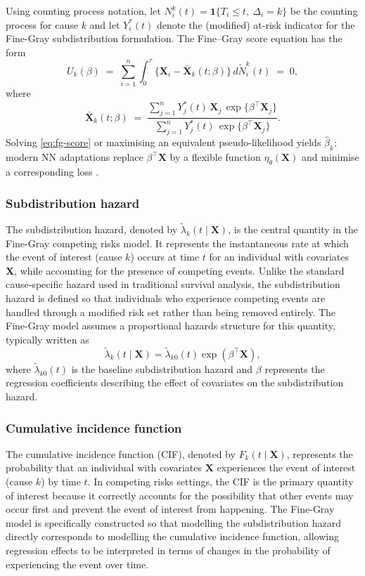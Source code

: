 \documentclass[a4paper,twoside,12pt]{report}
\begin{document}
Using counting process notation, let \(N_i^k(t)=\mathbf{1}\{T_i\le t,\ \Delta_i=k\}\) be the counting process for cause \(k\) and let \(Y_i^*(t)\) denote the (modified) at-risk indicator for the Fine-Gray subdistribution formulation. The Fine–Gray score equation has the form
\begin{equation}\label{eq:fg-score}
U_k(\beta) \;=\; \sum_{i=1}^n \int_0^\tau \big\{ \boldsymbol{X}_i - \bar{\boldsymbol{X}}_k(t;\beta)\big\}\,d\tilde N_i^k(t) \;=\; 0,
\end{equation}
where
\[
\bar{\boldsymbol{X}}_k(t;\beta) \;=\; 
\frac{\sum_{j=1}^n Y_j^*(t)\,\boldsymbol{X}_j\,\exp\{\beta^\top \boldsymbol{X}_j\}}{\sum_{j=1}^n Y_j^*(t)\,\exp\{\beta^\top \boldsymbol{X}_j\}}.
\]
Solving \eqref{eq:fg-score} or maximising an equivalent pseudo-likelihood yields \(\hat\beta_k\); modern NN adaptations replace \(\beta^\top \boldsymbol{X}\) by a flexible function \(\eta_\theta(\boldsymbol{X})\) and minimise a corresponding loss \citep{InterpretableFineGray2025}.

\subsubsection{Subdistribution hazard}
The subdistribution hazard, denoted by $\tilde{\lambda}_k(t \mid \boldsymbol{X})$, is the central quantity in the Fine-Gray competing risks model. It represents the instantaneous rate at which the event of interest (cause $k$) occurs at time $t$ for an individual with covariates $\boldsymbol{X}$, while accounting for the presence of competing events. Unlike the standard cause-specific hazard used in traditional survival analysis, the subdistribution hazard is defined so that individuals who experience competing events are handled through a modified risk set rather than being removed entirely. The Fine-Gray model assumes a proportional hazards structure for this quantity, typically written as
\[
\tilde{\lambda}_k(t \mid \boldsymbol{X}) = \tilde{\lambda}_{k0}(t)\exp(\beta^\top \boldsymbol{X}),
\]
where $\tilde{\lambda}_{k0}(t)$ is the baseline subdistribution hazard and $\beta$ represents the regression coefficients describing the effect of covariates on the subdistribution hazard.

\subsubsection{Cumulative incidence function}
The cumulative incidence function (CIF), denoted by $F_k(t \mid \boldsymbol{X})$, represents the probability that an individual with covariates $\boldsymbol{X}$ experiences the event of interest (cause $k$) by time $t$. In competing risks settings, the CIF is the primary quantity of interest because it correctly accounts for the possibility that other events may occur first and prevent the event of interest from happening. The Fine-Gray model is specifically constructed so that modelling the subdistribution hazard directly corresponds to modelling the cumulative incidence function, allowing regression effects to be interpreted in terms of changes in the probability of experiencing the event over time.
\end{document}
